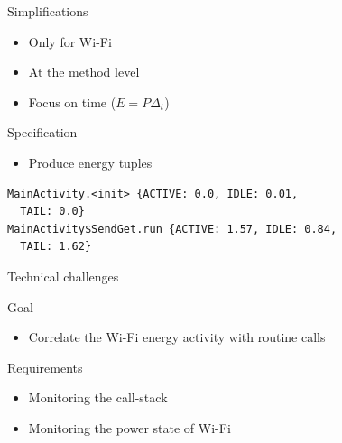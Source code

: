 %
%
\begin{frame}[fragile]{Simplifications}
\begin{itemize}
\item Only for Wi-Fi
\item At the method level
\item Focus on time ($E= P \Delta_t$)
\end{itemize}
\begin{block}{Specification}
\begin{itemize}
\item Produce energy tuples
\end{itemize}
\end{block}
\begin{lstlisting}
MainActivity.<init> {ACTIVE: 0.0, IDLE: 0.01,
  TAIL: 0.0}
MainActivity$SendGet.run {ACTIVE: 1.57, IDLE: 0.84,
  TAIL: 1.62}
\end{lstlisting}
\end{frame}
%
%
\begin{frame}{Technical challenges}
\begin{block}{Goal}
\begin{itemize}
\item \alert{Correlate} the Wi-Fi energy activity with routine calls
\end{itemize}
\end{block}
\begin{block}{Requirements}
\begin{itemize}
\item Monitoring the call-stack
\item Monitoring the power state of Wi-Fi
\end{itemize}
\end{block}
\end{frame}
